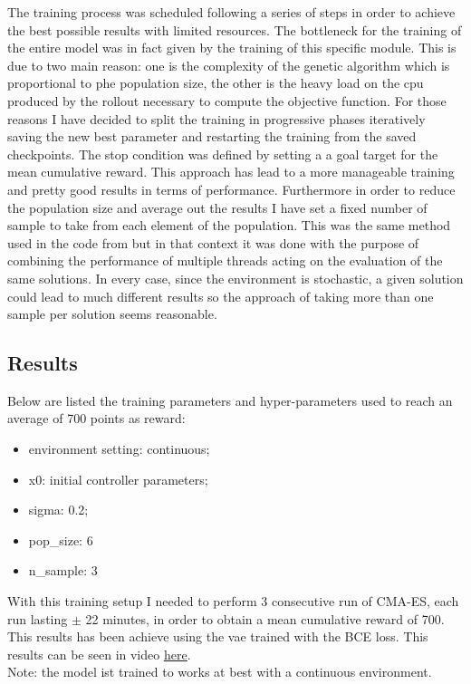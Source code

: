 \documentclass[10pt,a4paper]{article}
\begin{document}
The training process was scheduled following a series of steps in order to achieve the best possible results with limited resources. The bottleneck for the training of the entire model was in fact given by the training of this specific module. This is due to two main reason: one is the complexity of the genetic algorithm which is proportional to phe population size, the other is the heavy load on the cpu produced by the rollout necessary to compute the objective function. For those reasons I have decided to split the training in progressive phases iteratively saving the new best parameter and restarting the training from the saved checkpoints. The stop condition was defined by setting a a goal target for the mean cumulative reward. This approach has lead to a more manageable training and pretty good results in terms of performance. Furthermore in order to reduce the population size and average out the results I have set a fixed number of sample to take from each element of the population. This was the same method used in the code from \cite{ctallec-wm} but in that context it was done with the purpose of combining the performance of multiple threads acting on the evaluation of the same solutions. In every case, since the environment is stochastic, a given solution could lead to much different results so the approach of taking more than one sample per solution seems reasonable.\

\subsection{Results}
Below are listed the  training parameters and hyper-parameters used to reach an average of 700 points as reward:
\begin{itemize}
    \item environment setting: continuous;
    \item x0: initial controller parameters;
    \item sigma: 0.2;
    \item pop\_size: 6
    \item n\_sample: 3
\end{itemize}
With this training setup I needed to perform 3 consecutive run of CMA-ES, each run lasting $\pm$ 22 minutes, in order to obtain a mean cumulative reward of 700. This results has been achieve using the vae trained with the BCE loss. This results can be seen in video \href{https://drive.google.com/drive/folders/1k__Mbe3cCUXCfmbZ8MfM8Zqmpdaix_Ql}{\underline{here}}.\\
Note: the model ist trained to works at best with a continuous environment.

\newpage


\printbibliography

\end{document}
